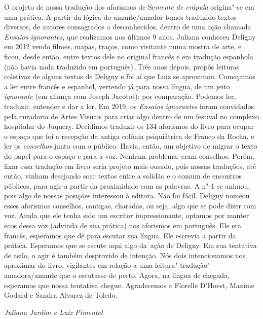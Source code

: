 O projeto de nossa tradução dos aforismos de Se\emph{mente de crápula}
origina"-se em uma prática. A partir da lógica do amante/amador temos
traduzido textos diversos, de autores consagrados a desconhecidos,
dentro de uma ação chamada \emph{Ensaios ignorantes}, que realizamos nos
últimos 9 anos. Juliana conheceu Deligny em 2012 vendo filmes, mapas,
traços, como visitante numa mostra de arte, e ficou, desde então, entre
textos dele no original francês e em tradução espanhola (não havia nada
traduzido em português). Três anos depois, propôs leituras coletivas de
alguns textos de Deligny e foi aí que Luiz se aproximou. Começamos a ler
entre francês e espanhol, vertendo já para nossa língua, de um jeito
\emph{ignorante} (em aliança com Joseph Jacotot): por comparação.
Podemos ler, traduzir, entender e dar a ler. Em 2019, os \emph{Ensaios
ignorantes} foram convidados pela curadoria de Artes Visuais para criar
algo dentro de um festival no complexo hospitalar do Juquery. Decidimos
traduzir os 134 aforismos do livro para ocupar o espaço que foi a
recepção da antiga colônia psiquiátrica de Franco da Rocha, e ler os
\emph{conselhos} junto com o público. Havia, então, um objetivo de
migrar o texto do papel para o espaço e para a voz. Nenhum problema:
eram conselhos. Porém, fixar essa tradução em livro seria projeto mais
ousado, pois nossas traduções, até então, vinham desejando soar textos
entre a solidão e o comum de encontros públicos, para agir a partir da
proximidade com as palavras. A n"-1 se animou, pois algo de nossas
posições interessou à editora. Não foi fácil. Deligny nomeou esses
aforismos conselhos, cantigas, charadas, ou seja, algo que se pode dizer
com voz. Ainda que ele tenha sido um escritor impressionante, optamos
por manter ecos dessa voz (advinda de sua prática) nos aforismos em
português. Ele era francês, esperamos que dê para escutar sua língua.
Ele escrevia a partir da prática. Esperamos que se escute aqui algo
da~ação de Deligny. Em sua tentativa de asilo, o agir é também
desprovido de intenção. Nós dois intencionamos nos aproximar do livro,
vigilantes em relação a uma leitura"-tradução"-amadora/amante que o
escutasse de perto. Agora, na língua de chegada, esperamos que nossa
tentativa chegue. Agradecemos a Florelle D'Hoest, Maxime Godard e Sandra
Alvarez de Toledo.

\hfill{}\emph{Juliana Jardim e Luiz Pimentel}
